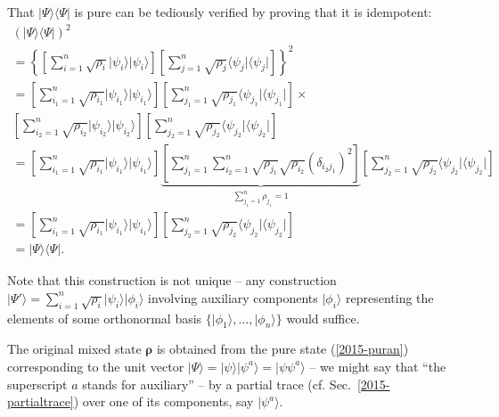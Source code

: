 {\color{OliveGreen}\bproof
That $\vert \Psi\rangle \langle \Psi \vert$ is pure can be tediously verified by proving that it is idempotent:
\begin{equation}
\begin{split}
(\vert \Psi\rangle \langle \Psi \vert )^2
\\=
\left\{
\left[\sum_{i=1}^n \sqrt{\rho_i}  \vert \psi_i\rangle  \vert \psi_i\rangle \right]
\left[\sum_{j=1}^n \sqrt{\rho_j}  \langle  \psi_j\vert \langle \psi_j\vert \right]
\right\}^2
\\=
\left[\sum_{i_1=1}^n \sqrt{\rho_{i_1}}  \vert \psi_{i_1}\rangle  \vert \psi_{i_1}\rangle \right]
\left[\sum_{j_1=1}^n \sqrt{\rho_{j_1}}  \langle  \psi_{j_1}\vert \langle \psi_{j_1}\vert \right]\times \\
\left[\sum_{i_2=1}^n \sqrt{\rho_{i_2}}  \vert \psi_{i_2}\rangle  \vert \psi_{i_2}\rangle \right]
\left[\sum_{j_2=1}^n \sqrt{\rho_{j_2}}  \langle  \psi_{j_2}\vert \langle \psi_{j_2}\vert \right]
\qquad
\\=
\left[\sum_{i_1=1}^n \sqrt{\rho_{i_1}}  \vert \psi_{i_1}\rangle  \vert \psi_{i_1}\rangle \right]
\underbrace{
\left[\sum_{j_1=1}^n \sum_{i_2=1}^n \sqrt{\rho_{j_1}}\sqrt{\rho_{i_2}}  (\delta_{i_2 j_1})^2 \right]
}_
{
 \sum_{j_1=1}^n   \rho_{j_1} = 1
}
\left[\sum_{j_2=1}^n \sqrt{\rho_{j_2}}  \langle  \psi_{j_2}\vert \langle \psi_{j_2}\vert \right]
\\=
\left[\sum_{i_1=1}^n \sqrt{\rho_{i_1}}  \vert \psi_{i_1}\rangle  \vert \psi_{i_1}\rangle \right]
\left[\sum_{j_2=1}^n \sqrt{\rho_{j_2}}  \langle  \psi_{j_2}\vert \langle \psi_{j_2}\vert \right]
\\=  \vert \Psi\rangle \langle \Psi \vert
.
\label{2015-puranproof}
\end{split}
\end{equation}
}

Note that this construction is not unique -- any construction
$\vert \Psi' \rangle = \sum_{i=1}^n \sqrt{\rho_i}  \vert \psi_i\rangle  \vert \phi_i\rangle$
involving auxiliary components
$\vert \phi_i\rangle$
representing the elements of some orthonormal basis $\{\vert \phi_1\rangle , \ldots , \vert \phi_n\rangle \}$
would suffice.

The original mixed state ${\boldsymbol{\rho}}$ is obtained from the pure state (\ref{2015-puran})
corresponding to the unit vector $\vert \Psi\rangle = \vert \psi \rangle \vert \psi^a \rangle  = \vert \psi \psi^a \rangle$
-- we might say that ``the superscript $a$ stands for auxiliary'' --
by a partial trace (cf. Sec.~\ref{2015-partialtrace}) over one of its components, say  $\vert \psi^a\rangle$.

